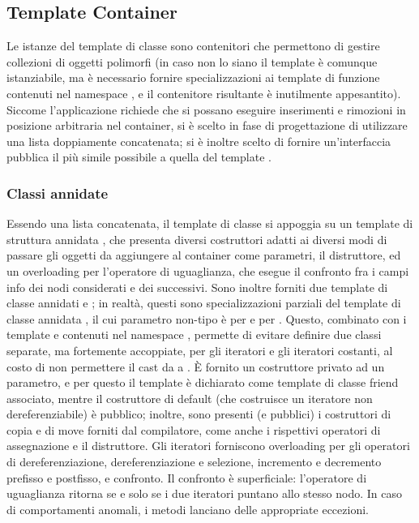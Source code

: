 \subsection{Template Container} %
\label{sub:template_container}
Le istanze del template di classe  sono contenitori che permettono di gestire collezioni di oggetti polimorfi (in caso non lo siano il template è comunque istanziabile, ma è necessario fornire specializzazioni ai template di funzione contenuti nel namespace , e il contenitore risultante è inutilmente appesantito). Siccome l'applicazione richiede che si possano eseguire inserimenti e rimozioni in posizione arbitraria nel container, si è scelto in fase di progettazione di utilizzare una lista doppiamente concatenata; si è inoltre scelto di fornire un'interfaccia pubblica il più simile possibile a quella del template .
\subsubsection{Classi annidate} %
\label{ssub:classi_annidate}
Essendo una lista concatenata, il template di classe si appoggia su un template di struttura annidata , che presenta diversi costruttori adatti ai diversi modi di passare gli oggetti da aggiungere al container come parametri, il distruttore, ed un overloading per l'operatore di uguaglianza, che esegue il confronto fra i campi info dei nodi considerati e dei successivi. Sono inoltre forniti due template di classe annidati  e ; in realtà, questi sono specializzazioni parziali del template di classe annidata , il cui parametro non-tipo  è  per  e  per . Questo, combinato con i template  e  contenuti nel namespace , permette di evitare definire due classi separate, ma fortemente accoppiate, per gli iteratori e gli iteratori costanti, al costo di non permettere il cast da  a . È fornito un costruttore privato ad un parametro, e per questo il template  è dichiarato come template di classe friend associato, mentre il costruttore di default (che costruisce un iteratore non dereferenziabile) è pubblico; inoltre, sono presenti (e pubblici) i costruttori di copia e di move forniti dal compilatore, come anche i rispettivi operatori di assegnazione e il distruttore. Gli iteratori forniscono overloading per gli operatori di dereferenziazione, dereferenziazione e selezione, incremento e decremento prefisso e postfisso, e confronto. Il confronto è superficiale: l'operatore di uguaglianza ritorna  se e solo se i due iteratori puntano allo stesso nodo. In caso di comportamenti anomali, i metodi lanciano delle appropriate eccezioni.
